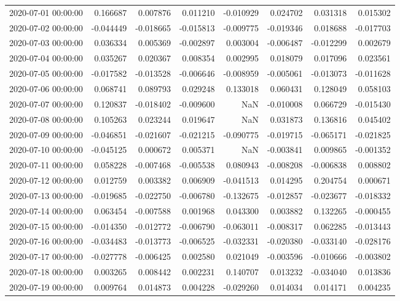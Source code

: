 \begin{tabular}{lrrrrrrr}
2020-07-01 00:00:00 & 0.166687 & 0.007876 & 0.011210 & -0.010929 & 0.024702 & 0.031318 & 0.015302 \\
2020-07-02 00:00:00 & -0.044449 & -0.018665 & -0.015813 & -0.009775 & -0.019346 & 0.018688 & -0.017703 \\
2020-07-03 00:00:00 & 0.036334 & 0.005369 & -0.002897 & 0.003004 & -0.006487 & -0.012299 & 0.002679 \\
2020-07-04 00:00:00 & 0.035267 & 0.020367 & 0.008354 & 0.002995 & 0.018079 & 0.017096 & 0.023561 \\
2020-07-05 00:00:00 & -0.017582 & -0.013528 & -0.006646 & -0.008959 & -0.005061 & -0.013073 & -0.011628 \\
2020-07-06 00:00:00 & 0.068741 & 0.089793 & 0.029248 & 0.133018 & 0.060431 & 0.128049 & 0.058103 \\
2020-07-07 00:00:00 & 0.120837 & -0.018402 & -0.009600 & NaN & -0.010008 & 0.066729 & -0.015430 \\
2020-07-08 00:00:00 & 0.105263 & 0.023244 & 0.019647 & NaN & 0.031873 & 0.136816 & 0.045402 \\
2020-07-09 00:00:00 & -0.046851 & -0.021607 & -0.021215 & -0.090775 & -0.019715 & -0.065171 & -0.021825 \\
2020-07-10 00:00:00 & -0.045125 & 0.000672 & 0.005371 & NaN & -0.003841 & 0.009865 & -0.001352 \\
2020-07-11 00:00:00 & 0.058228 & -0.007468 & -0.005538 & 0.080943 & -0.008208 & -0.006838 & 0.008802 \\
2020-07-12 00:00:00 & 0.012759 & 0.003382 & 0.006909 & -0.041513 & 0.014295 & 0.204754 & 0.000671 \\
2020-07-13 00:00:00 & -0.019685 & -0.022750 & -0.006780 & -0.132675 & -0.012857 & -0.023677 & -0.018332 \\
2020-07-14 00:00:00 & 0.063454 & -0.007588 & 0.001968 & 0.043300 & 0.003882 & 0.132265 & -0.000455 \\
2020-07-15 00:00:00 & -0.014350 & -0.012772 & -0.006790 & -0.063011 & -0.008317 & 0.062285 & -0.013443 \\
2020-07-16 00:00:00 & -0.034483 & -0.013773 & -0.006525 & -0.032331 & -0.020380 & -0.033140 & -0.028176 \\
2020-07-17 00:00:00 & -0.027778 & -0.006425 & 0.002580 & 0.021049 & -0.003596 & -0.010666 & -0.003802 \\
2020-07-18 00:00:00 & 0.003265 & 0.008442 & 0.002231 & 0.140707 & 0.013232 & -0.034040 & 0.013836 \\
2020-07-19 00:00:00 & 0.009764 & 0.014873 & 0.004228 & -0.029260 & 0.014034 & 0.014171 & 0.004235 \\

\end{tabular}

